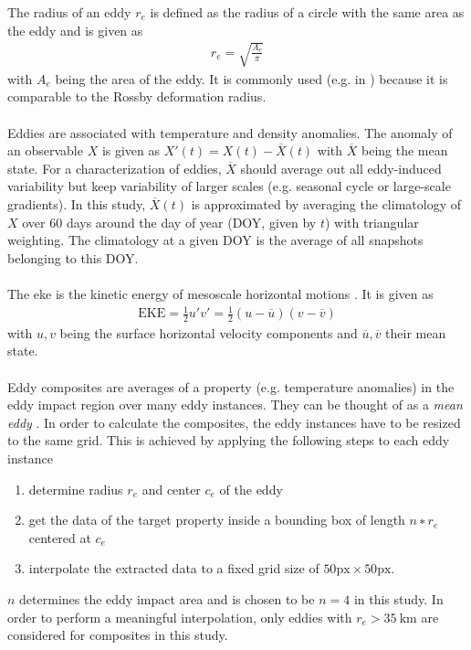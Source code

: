 The radius of an eddy $r_e$ is defined as the radius of a circle with the same area as the eddy and is given as
\begin{align}
    r_e = \sqrt{\frac{A_e}{\pi}}
\end{align}
with $A_e$ being the area of the eddy. It is commonly used (e.g. in \textcite{chelton-2011, kurian-2011-eddy-props}) because it is comparable to the Rossby deformation radius.\\
\\
Eddies are associated with temperature and density anomalies. The anomaly of an observable $X$ is given as $X'(t) = X(t) - \overline{X}(t)$ with $\overline{X}$ being the mean state. For a characterization of eddies, $\overline{X}$ should average out all eddy-induced variability but keep variability of larger scales (e.g. seasonal cycle or large-scale gradients). In this study, $\overline{X}(t)$ is approximated by averaging the climatology of $X$ over 60 days around the day of year (DOY, given by $t$) with triangular weighting. The climatology at a given DOY is the average of all snapshots belonging to this DOY.\\
\\
The \ac{eke} is the kinetic energy of mesoscale horizontal motions \autocite{rieck-2019-thesis-eke}. It is given as
\begin{align}
    \text{EKE} = \frac{1}{2}u'v' = \frac{1}{2}(u - \overline{u})(v - \overline{v})
\end{align}
with $u, v$ being the surface horizontal velocity components and $\overline{u}, \overline{v}$ their mean state.\\
\\
Eddy composites are averages of a property (e.g. temperature anomalies) in the eddy impact region over many eddy instances. They can be thought of as a \textit{mean eddy} \autocite{mcgilli-2016-meso-review}. In order to calculate the composites, the eddy instances have to be resized to the same grid. This is achieved by applying the following steps to each eddy instance
\begin{enumerate}
    \item determine radius $r_e$ and center $c_e$ of the eddy
    \item get the data of the target property inside a bounding box of length $n ∗ r_e$ centered at $c_e$
    \item interpolate the extracted data to a fixed grid size of $50\text{px} \times 50\text{px}$.
\end{enumerate}
$n$ determines the eddy impact area and is chosen to be $n = 4$ in this study. In order to perform a meaningful interpolation, only eddies with $r_e > \SI{35}{\kilo\metre}$ are considered for composites in this study.

